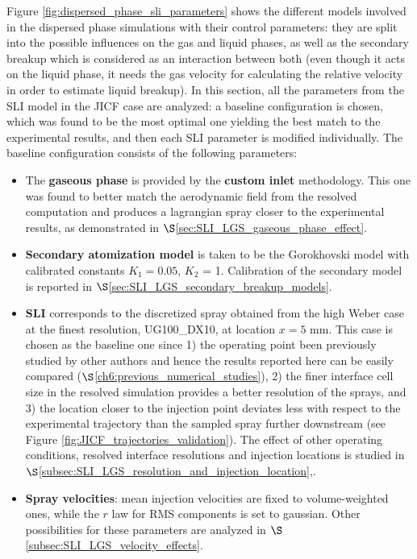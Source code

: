 Figure \ref{fig:dispersed_phase_sli_parameters} shows the different models involved in the dispersed phase simulations with their control parameters: they are split into the possible influences on the gas and liquid phases, as well as the secondary breakup which is considered as an interaction between both (even though it acts on the liquid phase, it needs the gas velocity for calculating the relative velocity in order to estimate liquid breakup). In this section, all the parameters from the SLI model in the JICF case are analyzed: a baseline configuration is chosen, which was found to be the most optimal one yielding the best match to the experimental results, and then each SLI parameter is modified individually. The baseline configuration consists of the following parameters:

\begin{itemize}

	\item The \textbf{gaseous phase} is provided by the \textbf{custom inlet} methodology. This one was found to better match the aerodynamic field from the resolved computation and produces a lagrangian spray closer to the experimental results, as demonstrated in $\S$\ref{sec:SLI_LGS_gaseous_phase_effect}.
	
	\item \textbf{Secondary atomization model} is taken to be the Gorokhovski model with calibrated constants $K_1 = 0.05$, $K_2$ = 1. Calibration of the secondary model is reported in $\S$\ref{sec:SLI_LGS_secondary_breakup_models}.
	
	\item \textbf{SLI} corresponds to the discretized spray obtained from the high Weber case at the finest resolution, UG100\_DX10, at location $x = 5$ mm. This case is chosen as the baseline one since 1) the operating point been previously studied by other authors and hence the results reported here can be easily compared ($\S$\ref{ch6:previous_numerical_studies}), 2) the finer interface cell size in the resolved simulation provides a better resolution of the sprays, and 3) the location closer to the injection point deviates less with respect to the experimental trajectory than the sampled spray further downstream (see Figure \ref{fig:JICF_trajectories_validation}). The effect of other operating conditions, resolved interface resolutions and injection locations is studied in $\S$\ref{subsec:SLI_LGS_resolution_and_injection_location},.
	
	\item \textbf{Spray velocities}: mean injection velocities are fixed to volume-weighted ones, while the $r$ law for RMS components is set to gaussian. Other possibilities for these parameters are analyzed in $\S$\ref{subsec:SLI_LGS_velocity_effects}.
	

\end{itemize}
